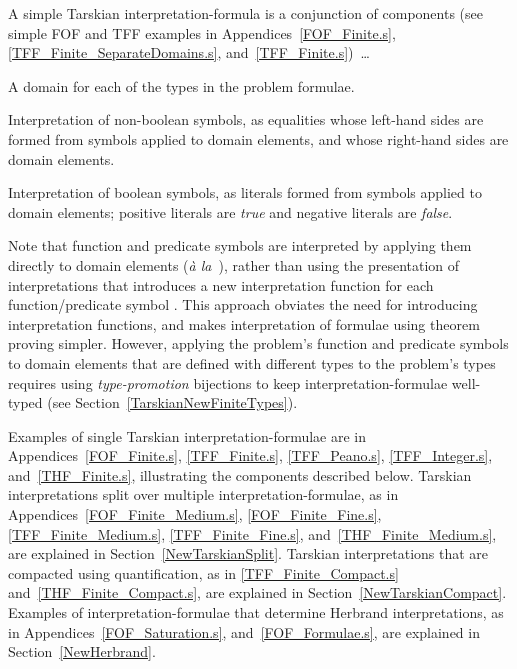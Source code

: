 \documentclass{easychair}
\newenvironment{packed_itemize}{
\vspace*{-0.3em}
\begin{itemize}
\setlength{\partopsep}{0pt}
\setlength{\itemsep}{1pt}
\setlength{\parskip}{0pt}
\setlength{\parsep}{0pt}
}{\end{itemize}}
\begin{document}
A simple Tarskian interpretation-formula is a conjunction of components (see simple FOF and TFF
examples in Appendices~\ref{FOF_Finite.s}, \ref{TFF_Finite_SeparateDomains.s}, 
and~\ref{TFF_Finite.s})~\ldots
\begin{packed_itemize}
\item A domain for each of the types in the problem formulae.
\item Interpretation of non-boolean symbols, as equalities whose left-hand sides are formed from 
      symbols applied to domain elements, and whose right-hand sides are domain elements.
\item Interpretation of boolean symbols, as literals formed from symbols applied to domain 
      elements; positive literals are \emph{true} and negative literals are \emph{false}.
\end{packed_itemize}

Note that function and predicate symbols are interpreted by applying them directly to domain
elements (\emph{{\`a} la}~\cite[\S5.3.4]{Gal15}), rather than using the presentation of 
interpretations that introduces a new interpretation function for each function/predicate symbol 
\cite[\S5.3.2]{Gal15}.
This approach obviates the need for introducing interpretation functions, and makes 
interpretation of formulae using theorem proving simpler.
However, applying the problem's function and predicate symbols to domain elements that are 
defined with different types to the problem's types requires using \emph{type-promotion} 
bijections to keep interpretation-formulae well-typed (see Section~\ref{TarskianNewFiniteTypes}).

Examples of single Tarskian interpretation-formulae are in Appendices~\ref{FOF_Finite.s}, 
\ref{TFF_Finite.s}, \ref{TFF_Peano.s}, \ref{TFF_Integer.s}, and~\ref{THF_Finite.s}, illustrating 
the components described below. 
Tarskian interpretations split over multiple interpretation-formulae, as in 
Appendices~\ref{FOF_Finite_Medium.s}, \ref{FOF_Finite_Fine.s}, \ref{TFF_Finite_Medium.s}, 
\ref{TFF_Finite_Fine.s}, and~\ref{THF_Finite_Medium.s}, are explained in 
Section~\ref{NewTarskianSplit}.
Tarskian interpretations that are compacted using quantification, as in \ref{TFF_Finite_Compact.s}
and~\ref{THF_Finite_Compact.s}, are explained in Section~\ref{NewTarskianCompact}.
Examples of interpretation-formulae that determine Herbrand interpretations, as in 
Appendices~\ref{FOF_Saturation.s}, and~\ref{FOF_Formulae.s}, are explained in 
Section~\ref{NewHerbrand}.
\end{document}
